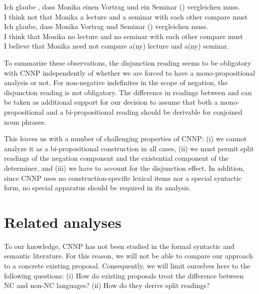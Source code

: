 \documentclass[output=paper]{langsci/langscibook}
\begin{document}
\ea \label{ex-glaub-notEX-reci}
\gll Ich glaube , dass Monika einen Vortrag und ein Seminar () vergleichen muss.\\
I think not that Monika a lecture and a seminar {with each other} compare must\\
\ex \label{ex-glaub-CNNP-reci}
\gll Ich glaube, dass Monika  Vortrag und  Seminar () vergleichen muss.\\
I think that Monika no lecture and no seminar {with each other} compare must\\
\ex \label{ex-glaub-X-reci-comp}
I believe that Monika need not compare a(ny) lecture and a(ny) seminar.
\z 

To summarize these observations, the disjunction reading seems to be obligatory with CNNP independently of whether we are forced to have a mono-pro\-po\-si\-tional analysis or not. 
For non-negative indefinites in the scope of negation, the disjunction reading is not obligatory. %
The difference in readings between  and 
can be taken as additional support for our decision to
assume that both a mono-propositional and a bi-propositional reading should be derivable for conjoined noun phrases.

This leaves us with a number of challenging properties of CNNP: 
(i) we cannot analyze it as a bi-propositional construction in all cases, 
(ii) we must permit split readings of the negation component and the existential component of the determiner, 
and (iii) we have to account for the disjunction effect. In addition, since CNNP uses no construction-specific lexical items nor a special syntactic form, no special apparatus should be required in its analysis.

\section{Related analyses}
\label{Sec-Previous}

To our knowledge, CNNP has not been studied in the formal syntactic and semantic literature. 
For this reason, we will not be able to compare our approach to a concrete existing proposal.
Consequently, we will limit ourselves here to the following questions: (i) How do existing proposals treat the difference between NC and non-NC languages? 
(ii) How do they derive split readings? 
\end{document}
